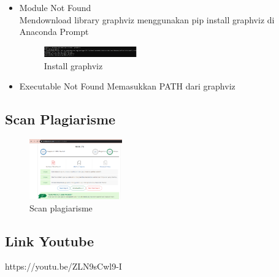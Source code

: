 \begin{enumerate}
\begin{itemize}
	\item Module Not Found\\
	Mendownload library graphviz menggunakan pip install graphviz di Anaconda Prompt
	\begin{figure}[H]
		\includegraphics[width=4cm]{figures/1174069/2/error/solusi2.PNG}
		\centering
		\caption{Install graphviz}
	\end{figure}
	
	\item Executable Not Found
	Memasukkan PATH dari graphviz
	
	\end{itemize}
\end{enumerate}

\subsection{Scan Plagiarisme}
\begin{figure}[H]
		\includegraphics[width=4cm]{figures/1174069/2/plagiarisme/plagiarisme.PNG}
		\centering
		\caption{Scan plagiarisme}
	\end{figure}
	
\subsection{Link Youtube}	
https://youtu.be/ZLN9sCwl9-I